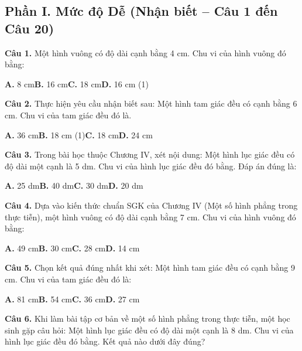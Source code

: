 \documentclass[11pt,a4paper]{article}
\begin{document}
\subsection*{\color{accent} Phần I. Mức độ Dễ (Nhận biết -- Câu 1 đến Câu 20)}
\textbf{\color{primary} Câu 1.} Một hình vuông có độ dài cạnh bằng 4 cm. Chu vi của hình vuông đó bằng:\par
\hspace*{1.5em}\textbf{A.} 8 cm\quad\quad \textbf{B.} 16 cm\quad\quad \textbf{C.} 18 cm\quad\quad \textbf{D.} 16 cm (1)\par\vspace{2pt}
\textbf{\color{primary} Câu 2.} Thực hiện yêu cầu nhận biết sau: Một hình tam giác đều có cạnh bằng 6 cm. Chu vi của tam giác đều đó là.\par
\hspace*{1.5em}\textbf{A.} 36 cm\quad\quad \textbf{B.} 18 cm (1)\quad\quad \textbf{C.} 18 cm\quad\quad \textbf{D.} 24 cm\par\vspace{2pt}
\textbf{\color{primary} Câu 3.} Trong bài học thuộc Chương IV, xét nội dung: Một hình lục giác đều có độ dài một cạnh là 5 dm. Chu vi của hình lục giác đều đó bằng. Đáp án đúng là:\par
\hspace*{1.5em}\textbf{A.} 25 dm\quad\quad \textbf{B.} 40 dm\quad\quad \textbf{C.} 30 dm\quad\quad \textbf{D.} 20 dm\par\vspace{2pt}
\textbf{\color{primary} Câu 4.} Dựa vào kiến thức chuẩn SGK của Chương IV (Một số hình phẳng trong thực tiễn), một hình vuông có độ dài cạnh bằng 7 cm. Chu vi của hình vuông đó bằng:\par
\hspace*{1.5em}\textbf{A.} 49 cm\quad\quad \textbf{B.} 30 cm\quad\quad \textbf{C.} 28 cm\quad\quad \textbf{D.} 14 cm\par\vspace{2pt}
\textbf{\color{primary} Câu 5.} Chọn kết quả đúng nhất khi xét: Một hình tam giác đều có cạnh bằng 9 cm. Chu vi của tam giác đều đó là:\par
\hspace*{1.5em}\textbf{A.} 81 cm\quad\quad \textbf{B.} 54 cm\quad\quad \textbf{C.} 36 cm\quad\quad \textbf{D.} 27 cm\par\vspace{2pt}
\textbf{\color{primary} Câu 6.} Khi làm bài tập cơ bản về một số hình phẳng trong thực tiễn, một học sinh gặp câu hỏi: Một hình lục giác đều có độ dài một cạnh là 8 dm. Chu vi của hình lục giác đều đó bằng. Kết quả nào dưới đây đúng?\par
\end{document}
